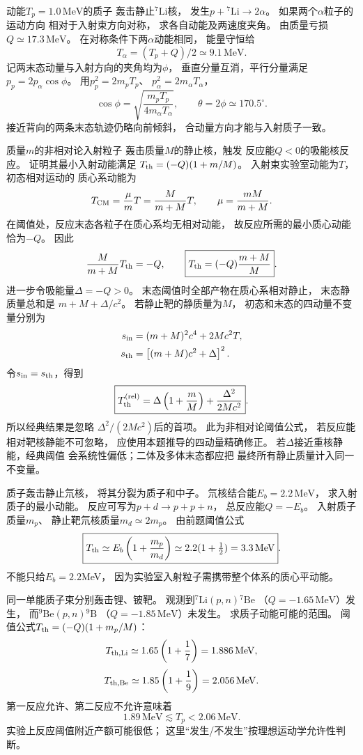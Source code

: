 动能$T_p=1.0\,\mathrm{MeV}$的质子
轰击静止$^{7}\mathrm{Li}$核，
发生$p+{}^{7}\mathrm{Li}\to2\alpha$。
如果两个$\alpha$粒子的运动方向
相对于入射束方向对称，
求各自动能及两速度夹角。
\exsolution
由质量亏损$Q\simeq17.3\,\mathrm{MeV}$。
在对称条件下两$\alpha$动能相同，
能量守恒给
\[
 \boxed{T_\alpha=(T_p+Q)/2\simeq9.1\,\mathrm{MeV}}.
\]
记两末态动量与入射方向的夹角均为$\phi$，
垂直分量互消，平行分量满足
$p_p=2p_\alpha\cos\phi$。
用$p_p^2=2m_pT_p$、
$p_\alpha^2=2m_\alpha T_\alpha$，
\[
 \cos\phi=
 \sqrt{\frac{m_pT_p}{4m_\alpha T_\alpha}},
 \qquad
 \boxed{\theta=2\phi\simeq170.5^\circ}.
\]
\excheck 接近背向的两条末态轨迹仍略向前倾斜，
合动量方向才能与入射质子一致。

质量$m$的非相对论入射粒子
轰击质量$M$的静止核，触发
反应能$Q<0$的吸能核反应。
证明其最小入射动能满足
$T_{\rm th}=(-Q)(1+m/M)$。
\exsolution
入射束实验室动能为$T$，初态相对运动的
质心系动能为
\[
 T_{\rm CM}=\frac{\mu}{m}T
 =\frac{M}{m+M}T,\qquad
 \mu=\frac{mM}{m+M}.
\]
在阈值处，反应末态各粒子在质心系均无相对动能，
故反应所需的最小质心动能恰为$-Q$。
因此
\[
 \frac{M}{m+M}T_{\rm th}=-Q,\qquad
 \boxed{T_{\rm th}=(-Q)\frac{m+M}{M}}.
\]
进一步令吸能量$\Delta=-Q>0$。
末态阈值时全部产物在质心系相对静止，
末态静质量总和是
$m+M+\Delta/c^2$。
若静止靶的静质量为$M$，
初态和末态的四动量不变量分别为
\[
 \begin{aligned}
 s_{\rm in}&=(m+M)^2c^4+2Mc^2T,\\
 s_{\rm th}&=\left[(m+M)c^2+\Delta\right]^2.
 \end{aligned}
\]
令$s_{\rm in}=s_{\rm th}$，得到
\[
 \boxed{T_{\rm th}^{\rm(rel)}
 =\Delta\left(1+\frac mM\right)
 +\frac{\Delta^2}{2Mc^2}}.
\]
所以经典结果是忽略
$\Delta^2/(2Mc^2)$后的首项。
\excheck 此为非相对论阈值公式，
若反应能相对靶核静能不可忽略，
应使用本题推导的四动量精确修正。
若$\Delta$接近重核静能，经典阈值
会系统性偏低；二体及多体末态都应把
最终所有静止质量计入同一不变量。

质子轰击静止氘核，
将其分裂为质子和中子。
氘核结合能$E_b=2.2\,\mathrm{MeV}$，
求入射质子的最小动能。
\exsolution
反应可写为$p+d\to p+p+n$，
总反应能$Q=-E_b$。
入射质子质量$m_p$、
静止靶氘核质量$m_d\simeq2m_p$。
由前题阈值公式
\[
 \boxed{T_{\rm th}\simeq
 E_b\left(1+\frac{m_p}{m_d}\right)
 \simeq2.2(1+\tfrac12)
 =3.3\,\mathrm{MeV}}.
\]
\excheck 不能只给$E_b=2.2$MeV，
因为实验室入射粒子需携带整个体系的质心平动能。

同一单能质子束分别轰击锂、铍靶。
观测到$^{7}\mathrm{Li}(p,n){}^{7}\mathrm{Be}$
（$Q=-1.65\,\mathrm{MeV}$）发生，
而$^{9}\mathrm{Be}(p,n){}^{9}\mathrm B$
（$Q=-1.85\,\mathrm{MeV}$）未发生。
求质子动能可能的范围。
\exsolution
阈值公式$T_{\rm th}=(-Q)(1+m_p/M)$：
\[
 T_{{\rm th},\mathrm{Li}}
 \simeq1.65\left(1+\frac17\right)
 =1.886\,\mathrm{MeV},
\]
\[
 T_{{\rm th},\mathrm{Be}}
 \simeq1.85\left(1+\frac19\right)
 =2.056\,\mathrm{MeV}.
\]
第一反应允许、第二反应不允许意味着
\[
 \boxed{1.89\,\mathrm{MeV}\lesssim T_p
 <2.06\,\mathrm{MeV}}.
\]
\excheck 实验上反应阈值附近产额可能很低；
这里“发生/不发生”按理想运动学允许性判断。

